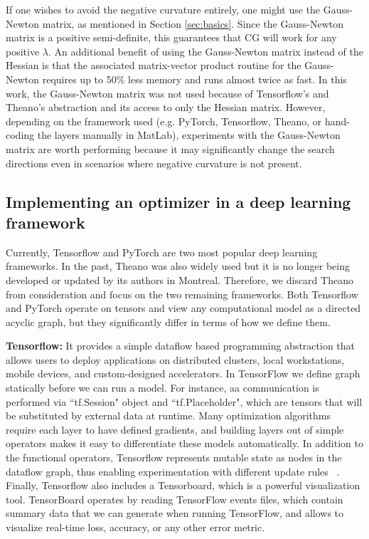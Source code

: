 \documentclass[10pt,twocolumn,letterpaper]{article}
\begin{document}
If one wishes to avoid the negative curvature entirely, one might use the Gauss-Newton matrix, as mentioned in Section \ref{sec:basics}. Since the Gauss-Newton matrix is a positive semi-definite, this guarantees that CG will work for any positive $\lambda$. An additional benefit of using the Gauss-Newton matrix instead of the Hessian is that the associated matrix-vector product routine for the Gauss-Newton requires up to 50\% less memory and runs almost twice as fast. In this work, the Gauss-Newton matrix was not used because of Tensorflow's and Theano's abstraction and its access to only the Hessian matrix. However, depending on the framework used (e.g. PyTorch, Tensorflow, Theano, or hand-coding the layers manually in MatLab), experiments with the Gauss-Newton matrix are worth performing because it may significantly change the search directions even in scenarios where negative curvature is not present.

\subsection{Implementing an optimizer in a deep learning framework}
\label{sec:deep_learning}

Currently, Tensorflow and PyTorch are two most popular deep learning frameworks. In the past, Theano was also widely used but it is no longer being developed or updated by its authors in Montreal. Therefore, we discard Theano from consideration and focus on the two remaining frameworks. Both Tensorflow and PyTorch operate on tensors and view any computational model as a directed acyclic graph, but they significantly differ in terms of how we define them.

\textbf{Tensorflow: }
It provides a simple dataflow based programming abstraction that allows users to deploy applications on distributed clusters, local workstations, mobile devices, and custom-designed accelerators. In TensorFlow we define graph statically before we can run a model. For instance, aa communication is performed via ``tf.Session" object and ``tf.Placeholder", which are tensors that will be substituted by external data at runtime. Many optimization algorithms require each layer to have defined gradients, and building layers out of simple operators makes it easy to differentiate these models automatically. In addition to the functional operators, Tensorflow represents mutable state as nodes in the dataflow graph, thus enabling experimentation with different update rules ~\cite{Abadi16}. Finally, Tensorflow also includes a Tensorboard, which is a powerful visualization tool. TensorBoard operates by reading TensorFlow events files, which contain summary data that we can generate when running TensorFlow, and allows to visualize real-time loss, accuracy, or any other error metric.
\end{document}
